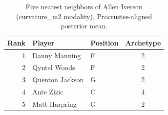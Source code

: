 \begin{table}[htbp]
  \centering\small
  \begin{tabular}{rllc}
    \toprule
    Rank & Player & Position & Archetype \\
    \midrule
    1 & Danny Manning & F & 2 \\
    2 & Qyntel Woods & F & 2 \\
    3 & Quenton Jackson & G & 2 \\
    4 & Ante Zizic & C & 4 \\
    5 & Matt Harpring & G & 2 \\
    \bottomrule
  \end{tabular}
  \caption{Five nearest neighbors of Allen Iverson (curvature_m2 modality), Procrustes-aligned posterior mean.}
  \label{tab:Allen_Iverson_neighbors_curvature_m2}
\end{table}

